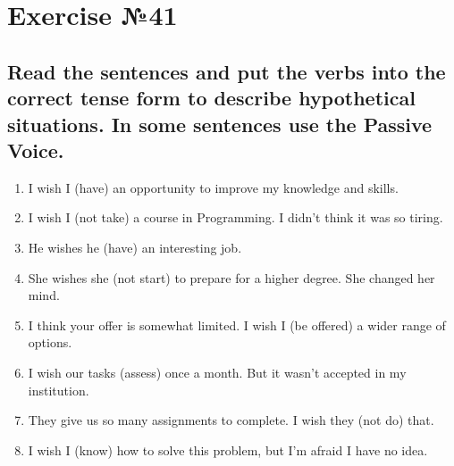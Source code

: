\section{Exercise №41}
\subsection*{Read the sentences and put the verbs into the correct tense form to describe
      hypothetical situations. In some sentences use the Passive Voice.}
\begin{enumerate}
      \item I wish I \underline{\hspace{2cm}} (have) an opportunity to improve my knowledge and skills.
      \item I wish I \underline{\hspace{2cm}} (not take) a course in Programming. I didn’t think it was so tiring.
      \item He wishes he \underline{\hspace{2cm}} (have) an interesting job.
      \item She wishes she \underline{\hspace{2cm}} (not start) to prepare for a higher degree. She changed her mind.
      \item I think your offer is somewhat limited. I wish I \underline{\hspace{2cm}} (be offered) a wider range of options.
      \item I wish our tasks \underline{\hspace{2cm}} (assess) once a month. But it wasn’t accepted in my institution.
      \item They give us so many assignments to complete. I wish they \underline{\hspace{2cm}} (not do) that.
      \item I wish I \underline{\hspace{2cm}} (know) how to solve this problem, but I’m afraid I have no idea.
\end{enumerate}

